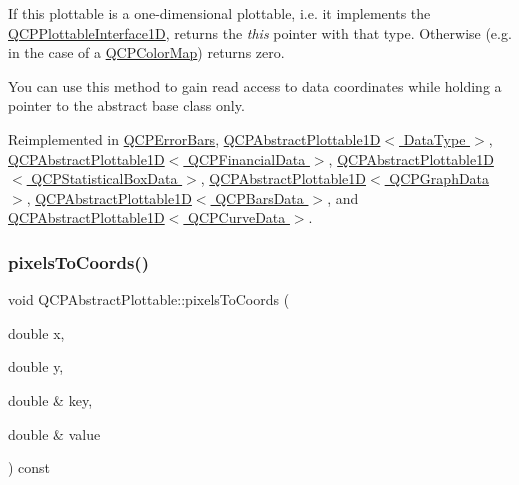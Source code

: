 If this plottable is a one-\/dimensional plottable, i.\+e. it implements the \hyperlink{class_q_c_p_plottable_interface1_d}{Q\+C\+P\+Plottable\+Interface1D}, returns the {\itshape this} pointer with that type. Otherwise (e.\+g. in the case of a \hyperlink{class_q_c_p_color_map}{Q\+C\+P\+Color\+Map}) returns zero.

You can use this method to gain read access to data coordinates while holding a pointer to the abstract base class only. 

Reimplemented in \hyperlink{class_q_c_p_error_bars_a0b6fbf3a943b4241ee485d066cc8562a}{Q\+C\+P\+Error\+Bars}, \hyperlink{class_q_c_p_abstract_plottable1_d_a3ab7511c279af967955369606c584dd6}{Q\+C\+P\+Abstract\+Plottable1\+D$<$ Data\+Type $>$}, \hyperlink{class_q_c_p_abstract_plottable1_d_a3ab7511c279af967955369606c584dd6}{Q\+C\+P\+Abstract\+Plottable1\+D$<$ Q\+C\+P\+Financial\+Data $>$}, \hyperlink{class_q_c_p_abstract_plottable1_d_a3ab7511c279af967955369606c584dd6}{Q\+C\+P\+Abstract\+Plottable1\+D$<$ Q\+C\+P\+Statistical\+Box\+Data $>$}, \hyperlink{class_q_c_p_abstract_plottable1_d_a3ab7511c279af967955369606c584dd6}{Q\+C\+P\+Abstract\+Plottable1\+D$<$ Q\+C\+P\+Graph\+Data $>$}, \hyperlink{class_q_c_p_abstract_plottable1_d_a3ab7511c279af967955369606c584dd6}{Q\+C\+P\+Abstract\+Plottable1\+D$<$ Q\+C\+P\+Bars\+Data $>$}, and \hyperlink{class_q_c_p_abstract_plottable1_d_a3ab7511c279af967955369606c584dd6}{Q\+C\+P\+Abstract\+Plottable1\+D$<$ Q\+C\+P\+Curve\+Data $>$}.

\mbox{\label{class_q_c_p_abstract_plottable_a3903c1120ab5c27e7fa46b597ef267bd}} 
\subsubsection{\texorpdfstring{pixels\+To\+Coords()}{pixelsToCoords()}\hspace{0.1cm}{\footnotesize\ttfamily [1/2]}}
{\footnotesize\ttfamily void Q\+C\+P\+Abstract\+Plottable\+::pixels\+To\+Coords (\begin{DoxyParamCaption}\item[{double}]{x,  }\item[{double}]{y,  }\item[{double \&}]{key,  }\item[{double \&}]{value }\end{DoxyParamCaption}) const}

